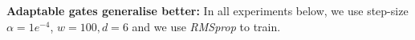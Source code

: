 \textbf{Adaptable gates generalise better:} In all experiments below, we use step-size $\alpha=1e^{-4}$, $w=100,d=6$ and we use \emph{RMSprop} to train.

